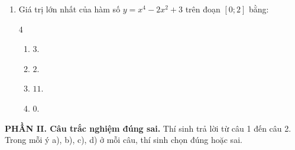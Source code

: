 \documentclass[12pt]{article}
\begin{document}
\begin{enumerate}[label=\textbf{Câu \arabic*.}, leftmargin=*]
		\item Giá trị lớn nhất của hàm số $y = x^4 - 2x^2 + 3$ trên đoạn $[0; 2]$ bằng:
		\begin{multicols}{4}
			\begin{enumerate}[label=\Alph*.]
				\item $3$.
				\item $2$.
				\item $11$.
				\item $0$.
			\end{enumerate}
		\end{multicols}
		
	\end{enumerate}
	
	\vspace{4mm}
	\noindent\textbf{PHẦN II. Câu trắc nghiệm đúng sai.} Thí sinh trả lời từ câu 1 đến câu 2. Trong mỗi ý a), b), c), d) ở mỗi câu, thí sinh chọn đúng hoặc sai.
	\vspace{2mm}
	
\end{document}
